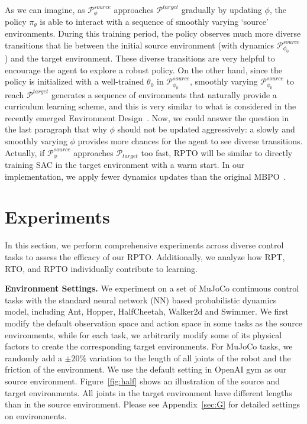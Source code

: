 \documentclass[letterpaper]{article} %
\def\P{{\mathcal{P}}}
\begin{document}
As we can imagine, as $\P_{\phi}^{source}$ approaches $\P^{target}$ gradually by updating $\phi$, the policy $\pi_{\theta}$ is able to interact with a sequence of smoothly varying `source' environments. During this training period, the policy observes much more diverse transitions that lie between the initial source environment (with dynamics $\P_{\phi_0}^{source}$) and the target environment. These diverse transitions are very helpful to encourage the agent to explore a robust policy. On the other hand, since the policy is initialized with a well-trained $\theta_0$ in $\P_{\phi_0}^{source}$, smoothly varying $\P_{\phi_0}^{source}$ to reach $\P^{target}$ generates a sequence of environments that naturally provide a curriculum learning scheme, and this is very similar to what is considered in the recently emerged Environment Design~\citep{dennis2020emergent}. Now, we could answer the question in the last paragraph that why $\phi$ should not be updated aggressively: a slowly and smoothly varying $\phi$ provides more chances for the agent to see diverse transitions. Actually, if $\P_{\phi}^{source}$ approaches $\P_{target}$ too fast, RPTO will be similar to directly training SAC in the target environment with a warm start.
In our implementation, we apply fewer dynamics updates than the original MBPO~\cite{janner2019trust}.





\section{Experiments}

In this section, we perform comprehensive experiments across diverse control tasks to assess the efficacy of our RPTO. Additionally, we analyze how RPT, RTO, and RPTO individually contribute to learning.


\textbf{Environment Settings.}
We experiment on a set of MuJoCo continuous control tasks with the standard neural network (NN) based probabilistic dynamics model, including Ant, Hopper, HalfCheetah, Walker2d and Swimmer.
We first modify the default observation space and action space in some tasks as the source environments,
while for each task, we arbitrarily modify some of its physical factors to create the corresponding target environments.
For MuJoCo tasks, we randomly add a $\pm20\%$ variation to the length of all joints of the robot and the friction of the environment.
We use the default setting in OpenAI gym as our source environment.
Figure~\ref{fig:half} shows an illustration of the source and target environments.
All joints in the target environment have different lengths than in the source environment.
Please see Appendix~\ref{sec:G} for detailed settings on environments.
\end{document}
